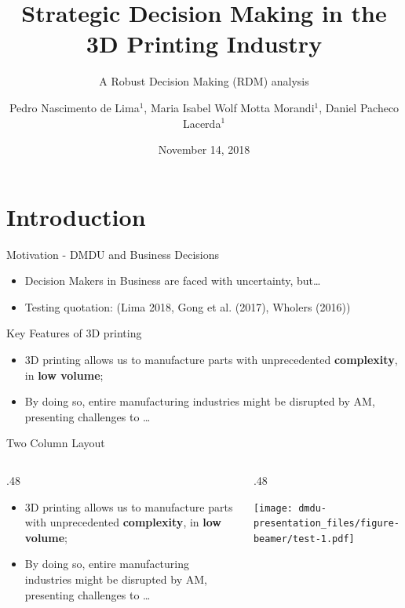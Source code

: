 \documentclass[12pt,ignorenonframetext,]{beamer}
\title{Strategic Decision Making in the 3D Printing Industry}
\subtitle{A Robust Decision Making (RDM) analysis}
\author{Pedro Nascimento de Lima\(^1\), Maria Isabel Wolf Motta Morandi\(^1\),
Daniel Pacheco Lacerda\(^1\)}
\institute{\(^1\) GMAP Research Group, UNISINOS University, RS, Brazil}
\date{November 14, 2018}
\providecommand{\tightlist}{%
  \setlength{\itemsep}{0pt}\setlength{\parskip}{0pt}}
\def\begincols{\begin{columns}}
\def\begincol{\begin{column}}
\def\endcol{\end{column}}
\def\endcols{\end{columns}}
\begin{document}
\frame{\titlepage}

\section{Introduction}\label{introduction}

\begin{frame}{Motivation - DMDU and Business Decisions}

\begin{itemize}
\tightlist
\item
  Decision Makers in Business are faced with uncertainty, but\ldots{}
\item
  Testing quotation: (Lima 2018, Gong et al. (2017), Wholers (2016))
\end{itemize}

\end{frame}

\begin{frame}{Key Features of 3D printing}

\begin{itemize}
\tightlist
\item
  3D printing allows us to manufacture parts with unprecedented
  \textbf{complexity}, in \textbf{low volume};
\item
  By doing so, entire manufacturing industries might be disrupted by AM,
  presenting challenges to \ldots{}
\end{itemize}

\end{frame}

\begin{frame}{Two Column Layout}

\begincols
 \begincol{.48\textwidth}

\begin{itemize}
\tightlist
\item
  3D printing allows us to manufacture parts with unprecedented
  \textbf{complexity}, in \textbf{low volume};
\item
  By doing so, entire manufacturing industries might be disrupted by AM,
  presenting challenges to \ldots{}
\end{itemize}

\endcol
\begincol{.48\textwidth}

\texttt{[image: dmdu-presentation\_files/figure-beamer/test-1.pdf]}

\endcol
\endcols

\end{frame}
\end{document}
